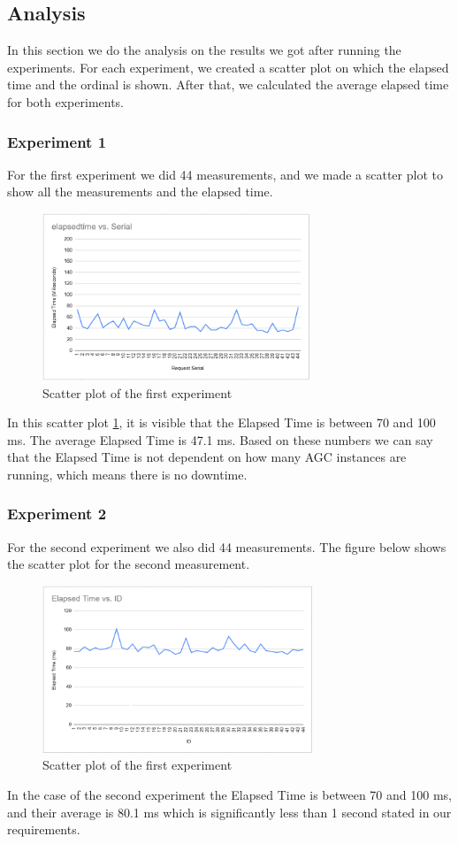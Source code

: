 \subsection{Analysis}
\label{sec:analysis}
In this section we do the analysis on the results we got after running the experiments. For each experiment, we created a scatter plot on which the elapsed time and the ordinal is shown. After that, we calculated the average elapsed time for both experiments.

\subsubsection{Experiment 1}
For the first experiment we did 44 measurements, and we made a scatter plot to show all the measurements and the elapsed time.


\begin{figure}[h]
\centering
  \includegraphics[height=5cm]{images/experiment_1_plot.png}
  \caption{Scatter plot of the first experiment}
  \label{fig:experiment_1_plot}
\end{figure}


In this scatter plot \ref{fig:experiment_1_plot}, it is visible that the Elapsed Time is between 70 and 100 ms. The average Elapsed Time is 47.1 ms. Based on these numbers we can say that the Elapsed Time is not dependent on how many AGC instances are running, which means there is no downtime.
\subsubsection{Experiment 2}
For the second experiment we also did 44 measurements. The figure below shows the scatter plot for the second measurement.

\begin{figure}[h]
\centering
  \includegraphics[height=5cm]{images/experiment_2_plot.png}
  \caption{Scatter plot of the first experiment}
  \label{fig:experiment_2_plot}
\end{figure}

In the case of the second experiment the Elapsed Time is between 70 and 100 ms, and their average is 80.1 ms which is significantly less than 1 second stated in our requirements.